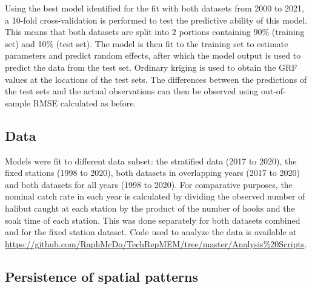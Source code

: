 \documentclass[12pt]{article}\usepackage[]{graphicx}\usepackage[]{color}
\begin{document}
Using the best model identified for the fit with both datasets from 2000 to 2021, a 10-fold cross-validation is performed to test the predictive ability of this model. This means that both datasets are split into 2 portions containing 90\% (training set) and 10\% (test set). The model is then fit to the training set to estimate parameters and predict random effects, after which the model output is used to predict the data from the test set. Ordinary kriging is used to obtain the GRF values at the locations of the test sets. The differences between the predictions of the test sets and the actual observations can then be observed using out-of-sample RMSE calculated as before.

\hypertarget{data}{%
\subsection{Data}\label{data}}

Models were fit to different data subset: the stratified data (2017 to 2020), the fixed stations (1998 to 2020), both datasets in overlapping years (2017 to 2020) and both datasets for all years (1998 to 2020). For comparative purposes, the nominal catch rate in each year is calculated by dividing the observed number of halibut caught at each station by the product of the number of hooks and the soak time of each station. This was done separately for both datasets combined and for the fixed station dataset. Code used to analyze the data is available at \url{https://github.com/RaphMcDo/TechRepMEM/tree/master/Analysis\%20Scripts}.

\hypertarget{persistence-of-spatial-patterns}{%
\subsection{Persistence of spatial patterns}\label{persistence-of-spatial-patterns}}
\end{document}
